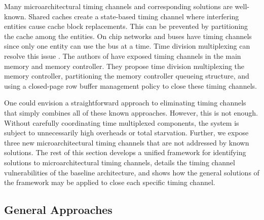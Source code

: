 Many microarchitectural timing channels and corresponding solutions are 
well-known. Shared caches create a state-based timing channel where interfering 
entities cause cache block replacements. This can be prevented by partitioning 
the cache among the entities. On chip networks and buses have
timing channels since only one entity can use the bus at a time. Time division 
multiplexing can resolve this issue \cite{yaonocs}. The authors of 
\cite{ushpca14} have exposed timing channels in the main memory and memory 
controller. They propose time division multiplexing the memory controller, 
partitioning the memory controller queueing structure, and using a closed-page 
row buffer management policy to close these timing channels. 

One could envision a straightforward approach to eliminating timing channels 
that simply combines all of these known approaches. However, this is not 
enough. Without carefully coordinating time multiplexed components, the system 
is subject to unnecessarily high overheads or total starvation.  Further, we 
expose three new microarchitectural timing channels that are not addressed by 
known solutions. The rest of this section develops a unified framework for 
identifying solutions to microarchitectural timing channels,
details the timing channel vulnerabilities of the baseline architecture, and 
shows how the general solutions of the framework may be applied to close each 
specific timing channel.

\subsection{General Approaches}

